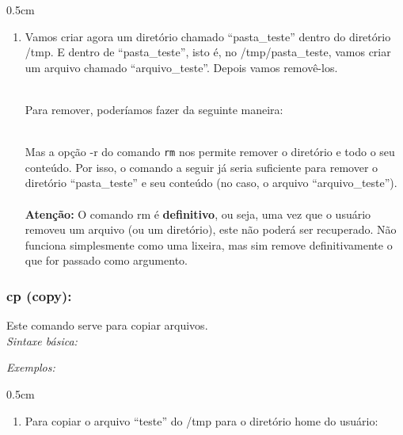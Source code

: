 \begin{refsection}
\begin {myindentpar}{0.5cm}
\begin{enumerate}[\itshape i.]
 \item{Vamos criar agora um diretório chamado ``pasta\_teste'' dentro do diretório /tmp. E dentro de ``pasta\_teste'', isto é, no /tmp/pasta\_teste, vamos criar um arquivo chamado ``arquivo\_teste''. Depois vamos removê-los.}
\\
 \\

Para remover, poderíamos fazer da seguinte maneira:\\
 \\

Mas a opção -r do comando \texttt{rm} nos permite remover o diretório e todo o seu conteúdo. Por isso, o comando a seguir já seria suficiente para remover o diretório ``pasta\_teste'' e seu conteúdo (no caso, o arquivo ``arquivo\_teste'').\\
\\
\textbf{Atenção:} O comando rm é \textbf{definitivo}, ou seja, uma vez que o usuário removeu um arquivo (ou um diretório), este não poderá ser recuperado. Não funciona simplesmente como uma lixeira, mas sim remove definitivamente o que for passado como argumento.\\

\end{enumerate}
\end{myindentpar}

\subsubsection{cp (copy):}\label{tut1:text_mode:commands:cp}

 Este comando serve para copiar arquivos.\\

\textit{Sintaxe básica:}
\\

\textit{Exemplos:}
\begin {myindentpar}{0.5cm}
\begin{enumerate}[\itshape i.]

\item{Para copiar o arquivo ``teste'' do /tmp para o diretório home do usuário:}\\
\end{enumerate}
\end{myindentpar}


\end{refsection}
